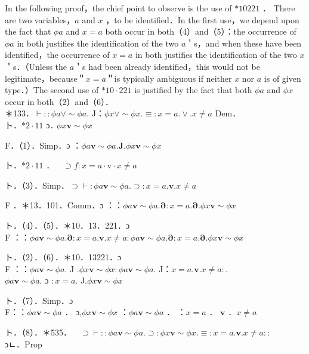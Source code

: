 \documentclass[10pt]{article}
\begin{document}
In the following proof，the chief point to observe is the use of $* 10221$ ． There are two variables，$a$ and $x$ ，to be identified．In the first use，we depend upon the fact that $\phi a$ and $x=a$ both occur in both（4）and（5）：the occurrence of $\phi a$ in both justifies the identification of the two $a$＇s，and when these have been identified，the occurrence of $x=a$ in both justifies the identification of the two $x$＇s．（Unless the $a$＇s had been already identified，this would not be legitimate，because＂$x=a$＂is typically ambiguous if neither $x$ nor $a$ is of given type．）The second use of $* 10 \cdot 221$ is justified by the fact that both $\phi a$ and $\phi x$ occur in both（2）and（6）．\\
＊133．$\vdash:: \phi a \vee \sim \phi a$. J：$\phi x \vee \sim \phi x . \equiv: x=a . \vee . x \neq a$ Dem．\\
ト．$* 2 \cdot 11$ ɔ․ $\phi x \mathbf{v} \sim \phi x$

F．（1）．Simp．ɔ ：$\phi a \mathbf{v} \sim \phi a . \boldsymbol{J} . \phi x \mathbf{v} \sim \phi x$

ト．$* 2 \cdot 11$ ．$\quad \supset f: x=a \cdot \mathrm{v} \cdot x \neq a$

ト．（3）．Simp．$\supset \vdash: \phi a \mathbf{v} \sim \phi a . \supset: x=a . \mathbf{v} . x \neq a$

F ．＊13．101．Comm．ɔ ：：$\phi a \mathbf{v} \sim \phi a . \boldsymbol{\partial}: x=a . \boldsymbol{\partial} . \phi x \mathbf{v} \sim \phi x$

ト．（4）．（5）．＊10．13．221．ɔ\\
F ：：$\phi a \mathbf{v} \sim \phi a . \boldsymbol{\partial}: x=a . \mathbf{v} . x \neq a: \phi a \mathbf{v} \sim \phi a . \boldsymbol{\partial}: x=a . \boldsymbol{\partial} . \phi x \mathbf{v} \sim \phi x$

ト．（2）．（6）．＊10．13221．ɔ\\
F ：：$\phi a \mathbf{v} \sim \phi a$. J $. \phi x \mathbf{v} \sim \phi x: \phi a \mathbf{v} \sim \phi a$. J：$x=a . \mathbf{v} . x \neq a:$.\\
$\phi a \mathbf{v} \sim \phi a$. ɔ $: x=a$. J.$\phi x \mathbf{v} \sim \phi x$

ト．（7）．Simp．ɔ\\
F：：$\phi a \mathbf{v} \sim \phi a$ ． ɔ,$\phi x \mathbf{v} \sim \phi x$ ：$\phi a \mathbf{v} \sim \phi a$ ． ：$x=a$ ． $\mathbf{v}$ ．$x \neq a$

ト．（8）．＊535．$\quad \supset \vdash:: \phi a \mathbf{v} \sim \phi a . \supset: \phi x \mathbf{v} \sim \phi x . \equiv: x=a . \mathbf{v} . x \neq a::$\\
ɔㄴ．Prop
\end{document}
